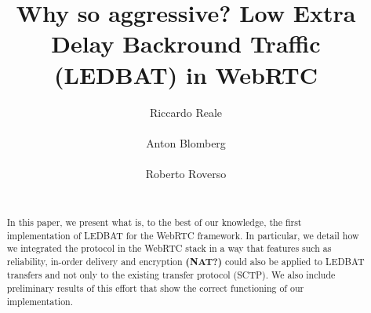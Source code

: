 \documentclass{sig-alternate}
\begin{document}


\title{Why so aggressive? Low Extra Delay Backround Traffic (LEDBAT) in WebRTC}


\author{
\alignauthor
Riccardo Reale\\
      \\
\alignauthor
Anton Blomberg\\
      \\
\alignauthor
Roberto Roverso\\
      \\
}

\newcommand{\mysec}[1]{\vspace*{-0.0cm}\section{#1}}
\newcommand{\mysubsec}[1]{\vspace*{-0.0cm}\subsection{#1}\vspace*{0cm}}
\newcommand{\mysubsubsec}[1]{\vspace*{-0.0cm}\subsubsection{#1}\vspace*{0cm}}
\newcommand{\mypar}[1]{\vspace*{-0cm}\paragraph{#1}\vspace*{0cm}}

\maketitle

\begin{abstract}

In this paper, we present what is, to the best of our knowledge, the first implementation
of LEDBAT for the WebRTC framework. In particular, we detail how we integrated the
protocol in the WebRTC stack in a way that features such as reliability, in-order
delivery and encryption \textbf{ (NAT?)} could also be applied to LEDBAT transfers and not only to
the existing transfer protocol (SCTP). We also include preliminary results of this effort
that show the correct functioning of our implementation.
\end{abstract}
\end{document}
